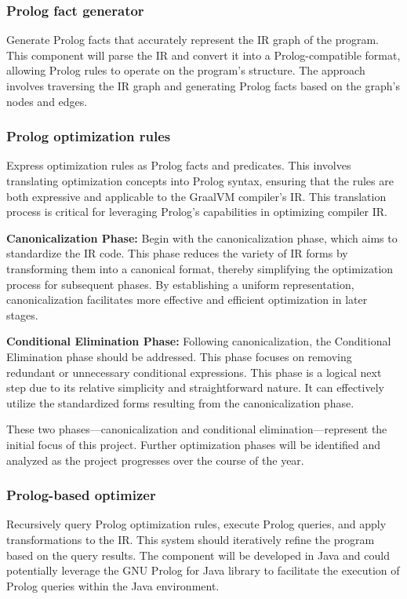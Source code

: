 \subsubsection{Prolog fact generator}
Generate Prolog facts that accurately represent the IR graph of the program. This component will parse the IR and convert it into a Prolog-compatible format, allowing Prolog rules to operate on the program's structure. The approach involves traversing the IR graph and generating Prolog facts based on the graph's nodes and edges.

\subsubsection{Prolog optimization rules}
Express optimization rules as Prolog facts and predicates. This involves translating optimization concepts into Prolog syntax, ensuring that the rules are both expressive and applicable to the GraalVM compiler's IR. This translation process is critical for leveraging Prolog's capabilities in optimizing compiler IR.
\begin{description}
    \item \textbf{Canonicalization Phase:} Begin with the canonicalization phase, which aims to standardize the IR code. This phase reduces the variety of IR forms by transforming them into a canonical format, thereby simplifying the optimization process for subsequent phases. By establishing a uniform representation, canonicalization facilitates more effective and efficient optimization in later stages.
    \item \textbf{Conditional Elimination Phase:} Following canonicalization, the Conditional Elimination phase should be addressed. This phase focuses on removing redundant or unnecessary conditional expressions. This phase is a logical next step due to its relative simplicity and straightforward nature. It can effectively utilize the standardized forms resulting from the canonicalization phase. 
\end{description}
These two phases—canonicalization and conditional elimination—represent the initial focus of this project. Further optimization phases will be identified and analyzed as the project progresses over the course of the year.

\subsubsection{Prolog-based optimizer}
Recursively query Prolog optimization rules, execute Prolog queries, and apply transformations to the IR. This system should iteratively refine the program based on the query results. The component will be developed in Java and could potentially leverage the GNU Prolog for Java library to facilitate the execution of Prolog queries within the Java environment. 


